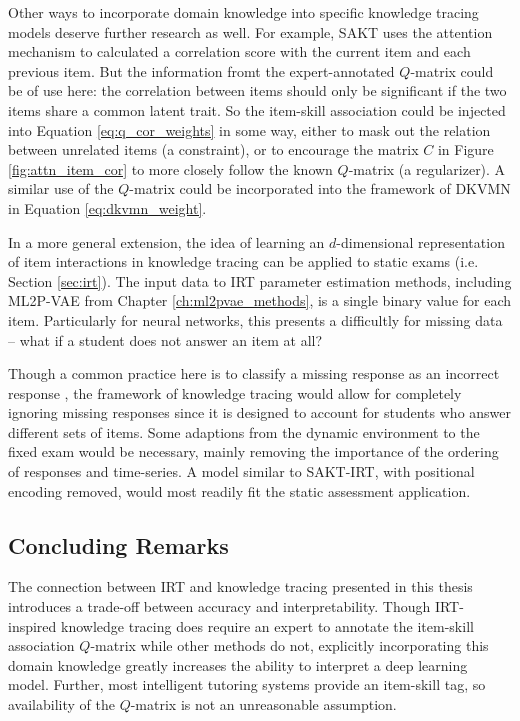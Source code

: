 Other ways to incorporate domain knowledge into specific knowledge tracing models deserve further research as well. For example, SAKT uses the attention mechanism to calculated a correlation score with the current item and each previous item. But the information fromt the expert-annotated $Q$-matrix could be of use here: the correlation between items should only be significant if the two items share a common latent trait. So the item-skill association could be injected into Equation \ref{eq:q_cor_weights} in some way, either to mask out the relation between unrelated items (a constraint), or to encourage the matrix $C$ in Figure \ref{fig:attn_item_cor} to more closely follow the known $Q$-matrix (a regularizer). A similar use of the $Q$-matrix could be incorporated into the framework of DKVMN in Equation \ref{eq:dkvmn_weight}.

In a more general extension, the idea of learning an $d$-dimensional representation of item interactions in knowledge tracing can be applied to static exams (i.e. Section \ref{sec:irt}). The input data to IRT parameter estimation methods, including ML2P-VAE from Chapter \ref{ch:ml2pvae_methods}, is a single binary value for each item. Particularly for neural networks, this presents a difficultly for missing data -- what if a student does not answer an item at all? 

Though a common practice here is to classify a missing response as an incorrect response \cite{thissen}, the framework of knowledge tracing would allow for completely ignoring missing responses since it is designed to account for students who answer different sets of items. Some adaptions from the dynamic environment to the fixed exam would be necessary, mainly removing the importance of the ordering of responses and time-series. A model similar to SAKT-IRT, with positional encoding removed, would most readily fit the static assessment application.

\subsection{Concluding Remarks}
The connection between IRT and knowledge tracing presented in this thesis introduces a trade-off between accuracy and interpretability. Though IRT-inspired knowledge tracing does require an expert to annotate the item-skill association $Q$-matrix while other methods do not, explicitly incorporating this domain knowledge greatly increases the ability to interpret a deep learning model. Further, most intelligent tutoring systems provide an item-skill tag, so availability of the $Q$-matrix is not an unreasonable assumption.

